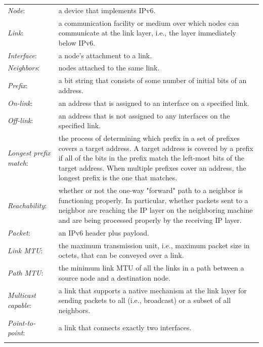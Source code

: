 \documentclass[12pt]{article}
\begin{document}
\begin{tabular}{L{3.3cm}L{12cm}}
\hdashline
\textit{Node}:&a device that implements IPv6\cite{rfc4861}.\\
\hdashline
\textit{Link}:&a communication facility or medium over which nodes can communicate at the link layer, i.e., the layer immediately below IPv6\cite{rfc4861}.\\
\hdashline
\textit{Interface}:&a node's attachment to a link\cite{rfc4861}.\\
\hdashline
\textit{Neighbors}:&nodes attached to the same link\cite{rfc4861}.\\
\hdashline
\textit{Prefix}:&a bit string that consists of some number of initial bits of an address\cite{rfc4861}.\\
\hdashline
\textit{On-link}:&an address that is assigned to an interface on a specified link\cite{rfc4861}.\\
\hdashline
\textit{Off-link}:&an address that is not assigned to any interfaces on the specified link\cite{rfc4861}.\\
\hdashline
\textit{Longest prefix match}:&the process of determining which prefix in a set of prefixes covers a target address. A target address is covered by a prefix if all of the bits in the prefix match the left-most bits of the target address. When multiple prefixes cover an address, the longest prefix is the one that matches\cite{rfc4861}.\\
\hdashline
\textit{Reachability}:&whether or not the one-way "forward" path to a neighbor is functioning properly. In particular, whether packets sent to a neighbor are reaching the IP layer on the neighboring machine and are being processed properly by the receiving IP layer\cite{rfc4861}.\\
\hdashline
\textit{Packet}:&an IPv6 header plus payload\cite{rfc4861}.\\
\hdashline
\textit{Link MTU}:&the maximum transmission unit, i.e., maximum packet size in octets, that can be conveyed over a link\cite{rfc4861}.\\
\hdashline
\textit{Path MTU}:&the minimum link MTU of all the links in a path between a source node and a destination node\cite{rfc4861}.\\
\hdashline
\textit{Multicast capable}:&a link that supports a native mechanism at the link layer for sending packets to all (i.e., broadcast) or a subset of all neighbors\cite{rfc4861}.\\
\hdashline
\textit{Point-to-point}:&a link that connects exactly two interfaces\cite{rfc4861}.\\
\hdashline
\end{tabular}
\end{document}
